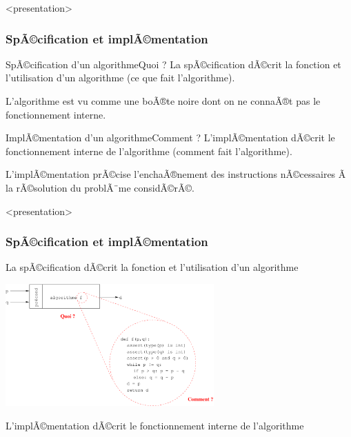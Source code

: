 \begin{frame}<presentation>
\frametitle{SpÃ©cification et implÃ©mentation}
\begin{block}{SpÃ©cification d'un algorithme\hfill Quoi ?}
La spÃ©cification dÃ©crit la fonction et l'utilisation d'un algorithme
(\alert{ce que fait l'algorithme}).

\pause
L'algorithme est vu comme une boÃ®te noire dont on ne connaÃ®t pas le
fonctionnement interne.
\end{block}
\pause
\begin{block}{ImplÃ©mentation d'un algorithme\hfill Comment ?}
L'implÃ©mentation dÃ©crit le fonctionnement interne de l'algorithme
(\alert{comment fait l'algorithme}).

\pause
L'implÃ©mentation prÃ©cise l'enchaÃ®nement des instructions nÃ©cessaires
Ã  la rÃ©solution du problÃ¨me considÃ©rÃ©.
\end{block}

\end{frame}

\begin{frame}<presentation>
\frametitle{SpÃ©cification et implÃ©mentation}
\footnotesize
La spÃ©cification dÃ©crit la fonction et l'utilisation d'un algorithme
\null\vfill

\centerline{\includegraphics[width=8cm]{../fig/algo.pdf}}
\null\vfill 

\mbox{}\hfill L'implÃ©mentation dÃ©crit le fonctionnement interne de l'algorithme
\end{frame}\note{}

